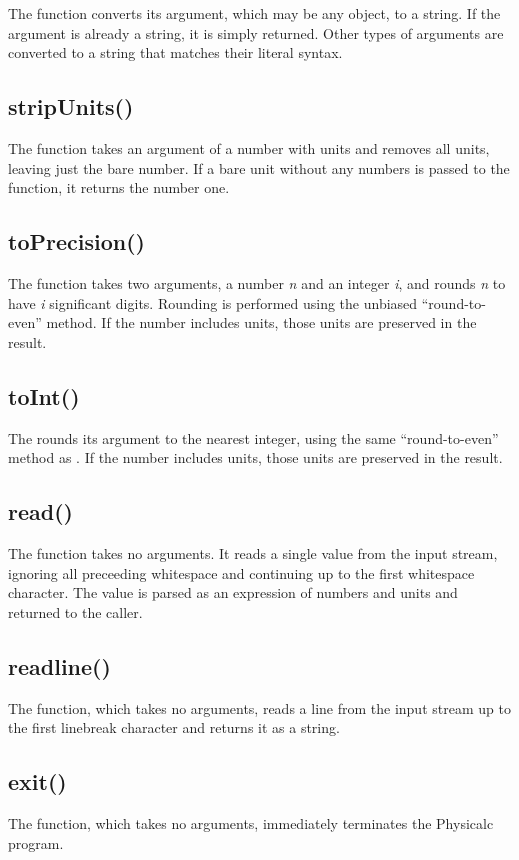 The  function converts its argument, which may be any
object, to a string.  If the argument is already a string, it is
simply returned.  Other types of arguments are converted to a string
that matches their literal syntax.

\subsection{stripUnits()}

The  function takes an argument of a number with
units and removes all units, leaving just the bare number.  If a bare
unit without any numbers is passed to the function, it returns the
number one.

\subsection{toPrecision()}

The  function takes two arguments, a number
\textit{n} and an integer \textit{i}, and rounds \textit{n} to have
\textit{i} significant digits.  Rounding is performed using the
unbiased ``round-to-even'' method.\cite{rounding} If the number
includes units, those units are preserved in the result.

\subsection{toInt()}

The  rounds its argument to the nearest integer, using
the same ``round-to-even'' method as .  If the
number includes units, those units are preserved in the result.

\subsection{read()}

The  function takes no arguments.  It reads a single value
from the input stream, ignoring all preceeding whitespace and
continuing up to the first whitespace character.  The value is parsed
as an expression of numbers and units and returned to the caller.

\subsection{readline()}

The  function, which takes no arguments, reads a line
from the input stream up to the first linebreak character and returns
it as a string.

\subsection{exit()}

The  function, which takes no arguments, immediately
terminates the Physicalc program.
